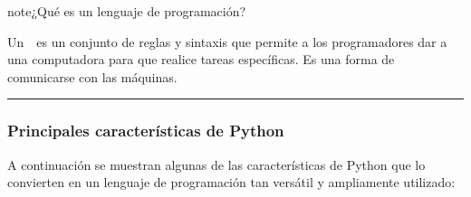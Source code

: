 \documentclass[letterpaper,10pt,spanish]{sphinxmanual}
\begin{document}
\begin{sphinxadmonition}{note}{¿Qué es un lenguaje de programación?}

\sphinxAtStartPar
Un  es un conjunto de reglas y sintaxis que permite a los programadores dar  a una computadora para que realice tareas específicas. Es una forma de comunicarse con las máquinas.
\end{sphinxadmonition}


\bigskip\hrule\bigskip



\subsubsection{Principales características de Python}
\label{\detokenize{1_guias/10programacion/G1024:principales-caracteristicas-de-python}}
\sphinxAtStartPar
A continuación se muestran algunas de las características de Python que lo convierten en un lenguaje de programación tan versátil y ampliamente utilizado:
\end{document}
